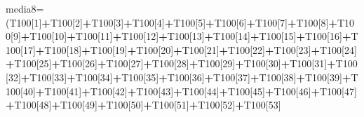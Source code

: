 \documentclass[
]{article}
\newenvironment{Shaded}{\begin{snugshade}}{\end{snugshade}}
\newcommand{\DecValTok}[1]{\textcolor[rgb]{0.00,0.00,0.81}{#1}}
\newcommand{\NormalTok}[1]{#1}
\newcommand{\OtherTok}[1]{\textcolor[rgb]{0.56,0.35,0.01}{#1}}
\newcommand{\SpecialCharTok}[1]{\textcolor[rgb]{0.81,0.36,0.00}{\textbf{#1}}}
\begin{document}
\begin{Shaded}
\begin{Highlighting}[]
\NormalTok{media8}\OtherTok{=}\NormalTok{(T100[}\DecValTok{1}\NormalTok{]}\SpecialCharTok{+}\NormalTok{T100[}\DecValTok{2}\NormalTok{]}\SpecialCharTok{+}\NormalTok{T100[}\DecValTok{3}\NormalTok{]}\SpecialCharTok{+}\NormalTok{T100[}\DecValTok{4}\NormalTok{]}\SpecialCharTok{+}\NormalTok{T100[}\DecValTok{5}\NormalTok{]}\SpecialCharTok{+}\NormalTok{T100[}\DecValTok{6}\NormalTok{]}\SpecialCharTok{+}\NormalTok{T100[}\DecValTok{7}\NormalTok{]}\SpecialCharTok{+}\NormalTok{T100[}\DecValTok{8}\NormalTok{]}\SpecialCharTok{+}\NormalTok{T100[}\DecValTok{9}\NormalTok{]}\SpecialCharTok{+}\NormalTok{T100[}\DecValTok{10}\NormalTok{]}\SpecialCharTok{+}\NormalTok{T100[}\DecValTok{11}\NormalTok{]}\SpecialCharTok{+}\NormalTok{T100[}\DecValTok{12}\NormalTok{]}\SpecialCharTok{+}\NormalTok{T100[}\DecValTok{13}\NormalTok{]}\SpecialCharTok{+}\NormalTok{T100[}\DecValTok{14}\NormalTok{]}\SpecialCharTok{+}\NormalTok{T100[}\DecValTok{15}\NormalTok{]}\SpecialCharTok{+}\NormalTok{T100[}\DecValTok{16}\NormalTok{]}\SpecialCharTok{+}\NormalTok{T100[}\DecValTok{17}\NormalTok{]}\SpecialCharTok{+}\NormalTok{T100[}\DecValTok{18}\NormalTok{]}\SpecialCharTok{+}\NormalTok{T100[}\DecValTok{19}\NormalTok{]}\SpecialCharTok{+}\NormalTok{T100[}\DecValTok{20}\NormalTok{]}\SpecialCharTok{+}\NormalTok{T100[}\DecValTok{21}\NormalTok{]}\SpecialCharTok{+}\NormalTok{T100[}\DecValTok{22}\NormalTok{]}\SpecialCharTok{+}\NormalTok{T100[}\DecValTok{23}\NormalTok{]}\SpecialCharTok{+}\NormalTok{T100[}\DecValTok{24}\NormalTok{]}\SpecialCharTok{+}\NormalTok{T100[}\DecValTok{25}\NormalTok{]}\SpecialCharTok{+}\NormalTok{T100[}\DecValTok{26}\NormalTok{]}\SpecialCharTok{+}\NormalTok{T100[}\DecValTok{27}\NormalTok{]}\SpecialCharTok{+}\NormalTok{T100[}\DecValTok{28}\NormalTok{]}\SpecialCharTok{+}\NormalTok{T100[}\DecValTok{29}\NormalTok{]}\SpecialCharTok{+}\NormalTok{T100[}\DecValTok{30}\NormalTok{]}\SpecialCharTok{+}\NormalTok{T100[}\DecValTok{31}\NormalTok{]}\SpecialCharTok{+}\NormalTok{T100[}\DecValTok{32}\NormalTok{]}\SpecialCharTok{+}\NormalTok{T100[}\DecValTok{33}\NormalTok{]}\SpecialCharTok{+}\NormalTok{T100[}\DecValTok{34}\NormalTok{]}\SpecialCharTok{+}\NormalTok{T100[}\DecValTok{35}\NormalTok{]}\SpecialCharTok{+}\NormalTok{T100[}\DecValTok{36}\NormalTok{]}\SpecialCharTok{+}\NormalTok{T100[}\DecValTok{37}\NormalTok{]}\SpecialCharTok{+}\NormalTok{T100[}\DecValTok{38}\NormalTok{]}\SpecialCharTok{+}\NormalTok{T100[}\DecValTok{39}\NormalTok{]}\SpecialCharTok{+}\NormalTok{T100[}\DecValTok{40}\NormalTok{]}\SpecialCharTok{+}\NormalTok{T100[}\DecValTok{41}\NormalTok{]}\SpecialCharTok{+}\NormalTok{T100[}\DecValTok{42}\NormalTok{]}\SpecialCharTok{+}\NormalTok{T100[}\DecValTok{43}\NormalTok{]}\SpecialCharTok{+}\NormalTok{T100[}\DecValTok{44}\NormalTok{]}\SpecialCharTok{+}\NormalTok{T100[}\DecValTok{45}\NormalTok{]}\SpecialCharTok{+}\NormalTok{T100[}\DecValTok{46}\NormalTok{]}\SpecialCharTok{+}\NormalTok{T100[}\DecValTok{47}\NormalTok{]}\SpecialCharTok{+}\NormalTok{T100[}\DecValTok{48}\NormalTok{]}\SpecialCharTok{+}\NormalTok{T100[}\DecValTok{49}\NormalTok{]}\SpecialCharTok{+}\NormalTok{T100[}\DecValTok{50}\NormalTok{]}\SpecialCharTok{+}\NormalTok{T100[}\DecValTok{51}\NormalTok{]}\SpecialCharTok{+}\NormalTok{T100[}\DecValTok{52}\NormalTok{]}\SpecialCharTok{+}\NormalTok{T100[}\DecValTok{53}\NormalTok{]}\Special
\end{Highlighting}
\end{Shaded}
\end{document}
